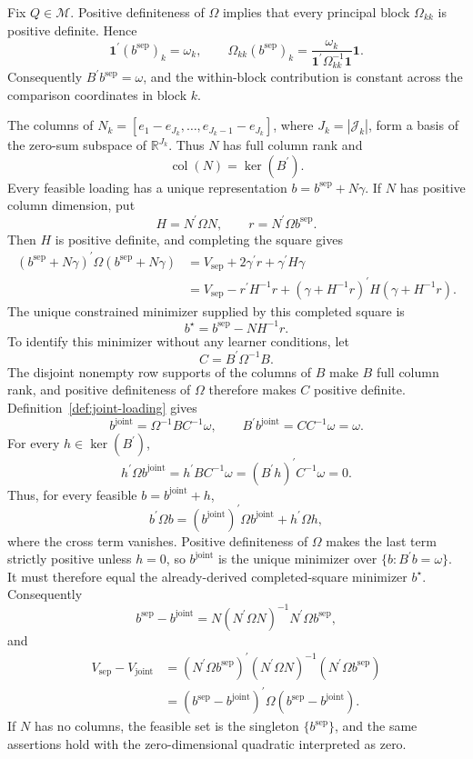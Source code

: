 Fix \(Q\in\mathcal M\). Positive definiteness of \(\Omega\) implies that every principal block \(\Omega_{kk}\) is positive definite. Hence
\[
 \mathbf 1^{\prime}(b^{\mathrm{sep}})_k=\omega_k,
 \qquad
 \Omega_{kk}(b^{\mathrm{sep}})_k
 =\frac{\omega_k}{\mathbf 1^{\prime}\Omega_{kk}^{-1}\mathbf 1}
 \mathbf 1.
\]
Consequently \(B^{\prime}b^{\mathrm{sep}}=\omega\), and the within-block contribution is constant across the comparison coordinates in block \(k\).

The columns of \(N_k=[e_1-e_{J_k},\ldots,e_{J_k-1}-e_{J_k}]\), where \(J_k=|\mathcal J_k|\), form a basis of the zero-sum subspace of \(\mathbb R^{J_k}\). Thus \(N\) has full column rank and
\[
 \operatorname{col}(N)=\ker(B^{\prime}).
\]
Every feasible loading has a unique representation \(b=b^{\mathrm{sep}}+N\gamma\). If \(N\) has positive column dimension, put
\[
 H=N^{\prime}\Omega N,
 \qquad
 r=N^{\prime}\Omega b^{\mathrm{sep}}.
\]
Then \(H\) is positive definite, and completing the square gives
\[
\begin{aligned}
 (b^{\mathrm{sep}}+N\gamma)^{\prime}\Omega
 (b^{\mathrm{sep}}+N\gamma)
 &=V_{\mathrm{sep}}+2\gamma^{\prime}r+
 \gamma^{\prime}H\gamma\\
 &=V_{\mathrm{sep}}-r^{\prime}H^{-1}r
 +(\gamma+H^{-1}r)^{\prime}H(\gamma+H^{-1}r).
\end{aligned}
\]
The unique constrained minimizer supplied by this completed square is
\[
 b^{\star}=b^{\mathrm{sep}}-NH^{-1}r.
\]
To identify this minimizer without any learner conditions, let
\[
 C=B^{\prime}\Omega^{-1}B.
\]
The disjoint nonempty row supports of the columns of \(B\) make \(B\) full column rank, and positive definiteness of \(\Omega\) therefore makes \(C\) positive definite. Definition~\ref{def:joint-loading} gives
\[
 b^{\mathrm{joint}}=\Omega^{-1}BC^{-1}\omega,
 \qquad
 B^{\prime}b^{\mathrm{joint}}=CC^{-1}\omega=\omega.
\]
For every \(h\in\ker(B^{\prime})\),
\[
 h^{\prime}\Omega b^{\mathrm{joint}}
 =h^{\prime}BC^{-1}\omega
 =(B^{\prime}h)^{\prime}C^{-1}\omega=0.
\]
Thus, for every feasible \(b=b^{\mathrm{joint}}+h\),
\[
 b^{\prime}\Omega b
 =(b^{\mathrm{joint}})^{\prime}\Omega b^{\mathrm{joint}}
 +h^{\prime}\Omega h,
\]
where the cross term vanishes. Positive definiteness of \(\Omega\) makes the last term strictly positive unless \(h=0\), so \(b^{\mathrm{joint}}\) is the unique minimizer over \(\{b:B^{\prime}b=\omega\}\). It must therefore equal the already-derived completed-square minimizer \(b^{\star}\). Consequently
\[
 b^{\mathrm{sep}}-b^{\mathrm{joint}}
 =N(N^{\prime}\Omega N)^{-1}N^{\prime}\Omega b^{\mathrm{sep}},
\]
and
\[
\begin{aligned}
 V_{\mathrm{sep}}-V_{\mathrm{joint}}
 &=(N^{\prime}\Omega b^{\mathrm{sep}})^{\prime}
 (N^{\prime}\Omega N)^{-1}
 (N^{\prime}\Omega b^{\mathrm{sep}})\\
 &=(b^{\mathrm{sep}}-b^{\mathrm{joint}})^{\prime}
 \Omega(b^{\mathrm{sep}}-b^{\mathrm{joint}}).
\end{aligned}
\]
If \(N\) has no columns, the feasible set is the singleton \(\{b^{\mathrm{sep}}\}\), and the same assertions hold with the zero-dimensional quadratic interpreted as zero.

